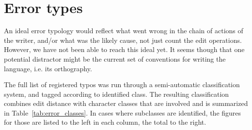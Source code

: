 \documentclass{flammie}
\begin{document}
\section{Error types}

An ideal error typology would reflect what went wrong in the chain of actions of
the writer, and/or what was the likely cause, not just count the edit
operations. However, we have not been able to reach this ideal yet. It seems
though that one potential distractor might be the current set of conventions for
writing the language, i.e. its orthography.

The full list of registered typos was run through a semi-automatic
classification system, and tagged according to identified class. The resulting
classification combines edit distance with character classes that are involved
and is summarized in Table~\ref{tab:error_classes}. In cases where subclasses
are identified, the figures for those are listed to the left in each column, the
total to the right.
\end{document}
